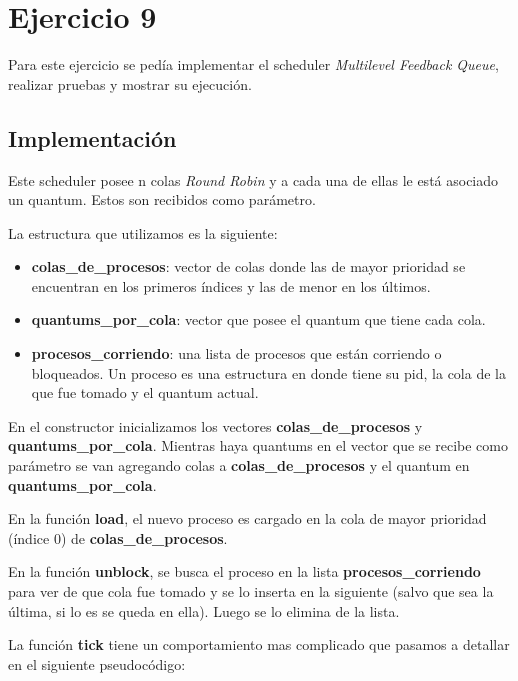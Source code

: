 \section{Ejercicio 9}

Para este ejercicio se pedía implementar el scheduler \textit{Multilevel Feedback Queue}, realizar pruebas y mostrar su ejecución.

\subsection{Implementación}

Este scheduler posee n colas \emph{Round Robin} y a cada una de ellas le está asociado un quantum. Estos son recibidos como parámetro.

La estructura que utilizamos es la siguiente:

\begin{itemize}

\item \textbf{colas\_de\_procesos}: vector de colas donde las de mayor prioridad se encuentran en los primeros índices y las de menor en los últimos.

\item \textbf{quantums\_por\_cola}: vector que posee el quantum que tiene cada cola.

\item \textbf{procesos\_corriendo}: una lista de procesos que están corriendo o bloqueados. Un proceso es una estructura en donde tiene su pid, la cola de la que fue tomado y el quantum actual.

\end{itemize}

En el constructor inicializamos los vectores \textbf{colas\_de\_procesos} y \textbf{quantums\_por\_cola}. Mientras haya quantums en el vector que se recibe como parámetro se van agregando colas a \textbf{colas\_de\_procesos} y el quantum en \textbf{quantums\_por\_cola}.

En la función \textbf{load}, el nuevo proceso es cargado en la cola de mayor prioridad (índice 0) de \textbf{colas\_de\_procesos}.

En la función \textbf{unblock}, se busca el proceso en la lista \textbf{procesos\_corriendo} para ver de que cola fue tomado y se lo inserta en la siguiente (salvo que sea la última, si lo es se queda en ella). Luego se lo elimina de la lista.

La función \textbf{tick} tiene un comportamiento mas complicado que pasamos a detallar en el siguiente pseudocódigo:

